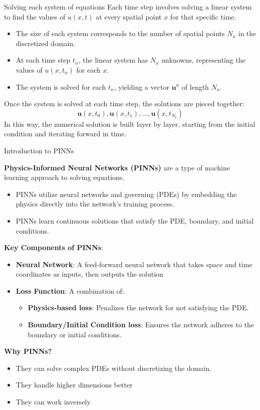 \documentclass{beamer}
\begin{document}
\begin{frame}{Solving each system of equations}
  Each time step involves solving a linear system to find the values of \( u(x,t) \) at every spatial point \( x \) for that specific time.

  \begin{itemize}
    \item The size of each system corresponds to the number of spatial points \( N_x \) in the discretized domain.
    \item At each time step \( t_n \), the linear system has \( N_x \) unknowns, representing the values of \( u(x,t_n) \) for each \( x \).
    \item The system is solved for each \( t_n \), yielding a vector \( \mathbf{u}^n \) of length \( N_x \).
  \end{itemize}

  Once the system is solved at each time step, the solutions are pieced together:
  \[
  \mathbf{u}(x,t_0), \mathbf{u}(x,t_1), \dots, \mathbf{u}(x,t_{N_t})
  \]
  In this way, the numerical solution is built layer by layer, starting from the initial condition and iterating forward in time.
\end{frame}

\begin{frame}{Introduction to PINNs}

\textbf{Physics-Informed Neural Networks (PINNs)} are a type of machine learning approach to solving equations.

\begin{itemize}
    \item PINNs utilize neural networks and governing (PDEs) by embedding the physics directly into the network's training process.
    \item PINNs learn continuous solutions that satisfy the PDE, boundary, and initial conditions.
\end{itemize}
\pause
\textbf{Key Components of PINNs}:
\begin{itemize}
    \item \textbf{Neural Network}: A feed-forward neural network that takes space and time coordinates as inputs, then outputs the solution
    \item \textbf{Loss Function}: A combination of:
    \begin{itemize}
        \item \textbf{Physics-based loss}: Penalizes the network for not satisfying the PDE.
        \item \textbf{Boundary/Initial Condition loss}: Ensures the network adheres to the boundary or initial conditions.
    \end{itemize}
\end{itemize}
\pause
\textbf{Why PINNs?}
\begin{itemize}
    \item They can solve complex PDEs without discretizing the domain.
    \item They handle higher dimensions better
    \item They can work inversely
\end{itemize}

\end{frame}
\end{document}
